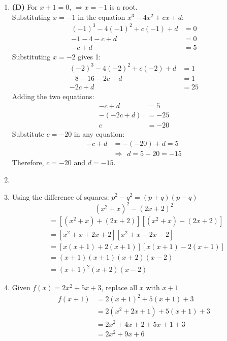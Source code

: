 \begin{multicols}{2}
\begin{enumerate}[label={\textbf{\arabic*.}}]
    \item \textbf{(D)} For \( x + 1 = 0 \), \(\Rightarrow x = -1\) is a root. \\
        Substituting \( x = -1 \) in the equation \( x^3 - 4x^2 + cx + d \):
        \begin{align*}
            (-1)^3 - 4(-1)^2 + c(-1) + d &= 0 \\
            -1 - 4 - c + d &= 0 \\
            -c + d &= 5
        \end{align*}
        Substituting \( x = -2 \) gives 1:
        \begin{align*}
            (-2)^3 - 4(-2)^2 + c(-2) + d &= 1 \\
            -8 - 16 - 2c + d &= 1 \\
            -2c + d &= 25
        \end{align*}
        Adding the two equations:
        \begin{align*}
            -c + d &= 5 \\
            -(-2c + d) &= -25 \\
            c &= -20
        \end{align*} 
        Substitute \( c = -20 \) in any equation:
        \begin{align*}
            -c + d &= -(-20) + d = 5 \\
            & \Rightarrow \hspace{5pt} d = 5 - 20 = -15
        \end{align*}
        Therefore, \( c = -20 \) and \( d = -15 \). 
    \item 
    
    \item Using the difference of squares: \(p^2 - q^2 = (p + q)(p - q)\)
    \[(x^2 + x)^2 - (2x + 2)^2\]
    \begin{align*}
         &= \left[(x^2 + x) + (2x + 2)\right]\left[(x^2 + x) - (2x + 2)\right] \\
         &= \left[x^2 + x + 2x + 2\right]\left[x^2 + x - 2x - 2\right] \\
         &= \left[x(x + 1) + 2(x + 1)\right]\left[x(x + 1) - 2(x + 1)\right] \\
         &= (x + 1)(x + 1)(x + 2)(x - 2) \\
         &= (x + 1)^2(x + 2)(x - 2)
    \end{align*}
    
    \item Given \(f(x) = 2x^2 + 5x + 3\), replace all \(x\) with \(x + 1\) 
     \begin{align*}
        f(x + 1) &= 2(x + 1)^2+ 5(x +1) + 3 \\
        & = 2(x^2 + 2x + 1) + 5(x + 1) + 3 \\
        & = 2x^2 + 4x + 2 + 5x + 1 + 3 \\
        & = 2x^2 + 9x + 6
     \end{align*}


\end{enumerate}
\end{multicols}
